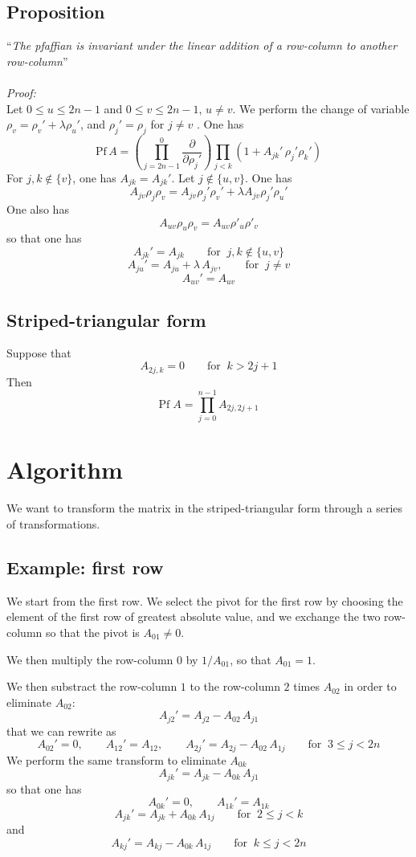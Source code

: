 \documentclass{article}
\begin{document}
\subsection{Proposition}
``{\it The pfaffian is invariant under the linear addition of a row-column to another row-column}''\\ \\
{\it Proof:}\\
Let $0\le u\le 2n-1$ and $0\le v\le 2n-1$, $u\neq v$. We perform the change of variable $\rho_v=\rho_v'+\lambda \rho_u'$, and $\rho_j' = \rho_j$ for $j\neq v$ . One has
$$
\text{Pf}\,A =  \left(\prod_{j=2n-1}^{0}\frac{\partial }{\partial \rho_{j}'}\right)\prod_{j<k}\left(1+A_{jk}'\,\rho_j'\rho_k'\right)
$$
For $j,k\notin\{v\}$, one has $A_{jk} = A_{jk}'$. Let $j\notin \{u, v\}$. One has
$$
A_{jv}\rho_j\rho_v=A_{jv}\rho_j'\rho_v' + \lambda A_{jv}\rho_j'\rho_u'
$$
One also has
$$
A_{uv}\rho_u\rho_v = A_{uv}\rho'_u\rho'_v
$$
so that one has
$$
A_{jk}' = A_{jk}\qquad \text{for}\;\; j,k\notin \{u,v\}
$$
$$
A_{ju}' = A_{ju}+\lambda\,A_{jv},\qquad \text{for}\;\;j\neq v
$$
$$
A_{uv}' = A_{uv}
$$
\subsection{Striped-triangular form}
Suppose that
$$
A_{2j, k} = 0 \qquad \text{for}\;\; k>2j+1
$$
Then
$$
\text{Pf}\;A = \prod_{j=0}^{n-1} A_{2j,2j+1}
$$
\section{Algorithm}
We want to transform the matrix in the striped-triangular form through a series of transformations.
\subsection{Example: first row}
We start from the first row. We select the pivot for the first row by choosing the element of the first row of greatest absolute value, and we exchange the two row-column so that the pivot is $A_{01}\neq 0$.

We then multiply the row-column $0$ by $1/A_{01}$, so that $A_{01} = 1$.

We then substract the row-column $1$ to the row-column $2$ times $A_{02}$ in order to eliminate $A_{02}$:
$$
A_{j2}' = A_{j2}-A_{02}\,A_{j1}
$$
that we can rewrite as
$$
A_{02}' = 0,\qquad A_{12}' = A_{12},\qquad A_{2j}' = A_{2j}-A_{02}\,A_{1j} \qquad \text{for}\;\; 3\le j< 2n
$$
We perform the same transform to eliminate $A_{0k}$
$$
A_{jk}' = A_{jk} - A_{0k}\,A_{j1}
$$
so that one has
$$
A_{0k}' = 0,\qquad A_{1k}' = A_{1k}
$$
$$
A_{jk}' = A_{jk}+A_{0k}\,A_{1j} \qquad \text{for}\;\; 2\le j <k
$$
and
$$
A_{kj}' = A_{kj}-A_{0k}\,A_{1j} \qquad \text{for}\;\; k\le j <2n
$$
\end{document}
